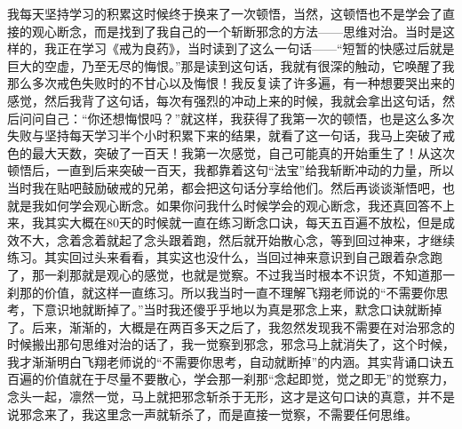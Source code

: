 \begin{case}
    我每天坚持学习的积累这时候终于换来了一次顿悟，当然，这顿悟也不是学会了直接的观心断念，而是找到了我自己的一个斩断邪念的方法——思维对治。当时是这样的，我正在学习《戒为良药》，当时读到了这么一句话——“短暂的快感过后就是巨大的空虚，乃至无尽的悔恨。”那是读到这句话，我就有很深的触动，它唤醒了我那么多次戒色失败时的不甘心以及悔恨！我反复读了许多遍，有一种想要哭出来的感觉，然后我背了这句话，每次有强烈的冲动上来的时候，我就会拿出这句话，然后问问自己：“你还想悔恨吗？”就这样，我获得了我第一次的顿悟，也是这么多次失败与坚持每天学习半个小时积累下来的结果，就看了这一句话，我马上突破了戒色的最大天数，突破了一百天！我第一次感觉，自己可能真的开始重生了！从这次顿悟后，一直到后来突破一百天，我都靠着这句“法宝”给我斩断冲动的力量，所以当时我在贴吧鼓励破戒的兄弟，都会把这句话分享给他们。然后再谈谈渐悟吧，也就是我如何学会观心断念。如果你问我什么时候学会的观心断念，我还真回答不上来，我其实大概在80天的时候就一直在练习断念口诀，每天五百遍不放松，但是成效不大，念着念着就起了念头跟着跑，然后就开始散心念，等到回过神来，才继续练习。其实回过头来看看，其实这也没什么，当回过神来意识到自己跟着杂念跑了，那一刹那就是观心的感觉，也就是觉察。不过我当时根本不识货，不知道那一刹那的价值，就这样一直练习。所以我当时一直不理解飞翔老师说的“不需要你思考，下意识地就断掉了。”当时我还傻乎乎地以为真是邪念上来，默念口诀就断掉了。后来，渐渐的，大概是在两百多天之后了，我忽然发现我不需要在对治邪念的时候搬出那句思维对治的话了，我一觉察到邪念，邪念马上就消失了，这个时候，我才渐渐明白飞翔老师说的“不需要你思考，自动就断掉”的内涵。其实背诵口诀五百遍的价值就在于尽量不要散心，学会那一刹那“念起即觉，觉之即无”的觉察力，念头一起，凛然一觉，马上就把邪念斩杀于无形，这才是这句口诀的真意，并不是说邪念来了，我这里念一声就斩杀了，而是直接一觉察，不需要任何思维。

\end{case}
